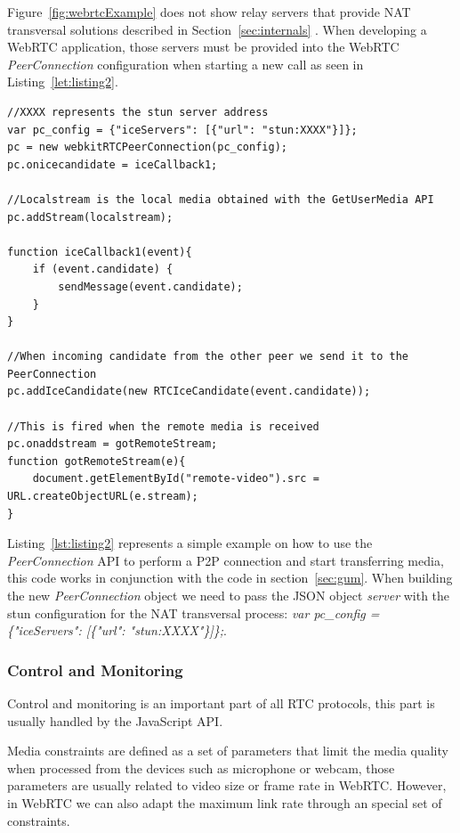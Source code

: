 Figure~\ref{fig:webrtcExample} does not show relay servers that provide NAT transversal solutions described in Section~\ref{sec:internals} . When developing a WebRTC application, those servers must be provided into the WebRTC {\it PeerConnection} configuration when starting a new call as seen in Listing~\ref{let:listing2}.

\lstset{language=JavaScript}
\begin{lstlisting}[caption=Simple example of {\it PeerConnection} using JavaScript,label={lst:listing2}]
//XXXX represents the stun server address
var pc_config = {"iceServers": [{"url": "stun:XXXX"}]};
pc = new webkitRTCPeerConnection(pc_config);
pc.onicecandidate = iceCallback1;

//Localstream is the local media obtained with the GetUserMedia API
pc.addStream(localstream);

function iceCallback1(event){
	if (event.candidate) {
		sendMessage(event.candidate);
	}
}

//When incoming candidate from the other peer we send it to the PeerConnection
pc.addIceCandidate(new RTCIceCandidate(event.candidate));

//This is fired when the remote media is received
pc.onaddstream = gotRemoteStream; 
function gotRemoteStream(e){
	document.getElementById("remote-video").src = URL.createObjectURL(e.stream);
}
\end{lstlisting}

Listing~\ref{lst:listing2} represents a simple example on how to use the {\it PeerConnection} API to perform a P2P connection and start transferring media, this code works in conjunction with the code in section~\ref{sec:gum}. When building the new {\it PeerConnection} object we need to pass the JSON object {\it server} with the stun configuration for the NAT transversal process: {\it var pc\_config = \{"iceServers": [\{"url": "stun:XXXX"\}]\};}. 

\subsubsection{Control and Monitoring}

Control and monitoring is an important part of all RTC protocols, this part is usually handled by the JavaScript API.

Media constraints are defined as a set of parameters that limit the media quality when processed from the devices such as microphone or webcam, those parameters are usually related to video size or frame rate in WebRTC. However, in WebRTC we can also adapt the maximum link rate through an special set of constraints.

